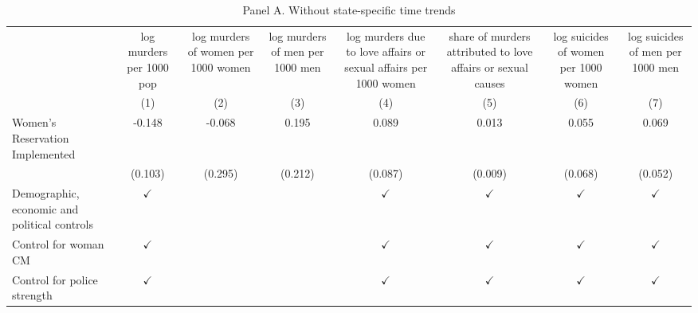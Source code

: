 
\begin{table}[htbp]
   \caption{Panel A. Without state-specific time trends}
   \bigskip
   \centering
   \begin{tabular}{lccccccc}
      \toprule
                                                    & log murders per 1000 pop & log murders of women per 1000 women & log murders of men per 1000 men &  log murders due to love affairs or sexual affairs per 1000 women & share of murders attributed to love affairs or sexual causes & log suicides of women per 1000 women & log suicides of men per 1000 men\\  
                                                    & (1)                      & (2)                                 & (3)                             & (4)                                                               & (5)                                                          & (6)                                  & (7)\\  
      \midrule 
      Women's Reservation Implemented               & -0.148                   & -0.068                              & 0.195                           & 0.089                                                             & 0.013                                                        & 0.055                                & 0.069\\   
                                                    & (0.103)                  & (0.295)                             & (0.212)                         & (0.087)                                                           & (0.009)                                                      & (0.068)                              & (0.052)\\   
      Demographic, economic  and political controls & $\checkmark$             &                                     &                                 & $\checkmark$                                                      & $\checkmark$                                                 & $\checkmark$                         & $\checkmark$\\   
      Control for woman CM                          & $\checkmark$             &                                     &                                 & $\checkmark$                                                      & $\checkmark$                                                 & $\checkmark$                         & $\checkmark$\\   
      Control for police strength                   & $\checkmark$             &                                     &                                 & $\checkmark$                                                      & $\checkmark$                                                 & $\checkmark$                         & $\checkmark$\\   

\end{tabular}
\end{table}
